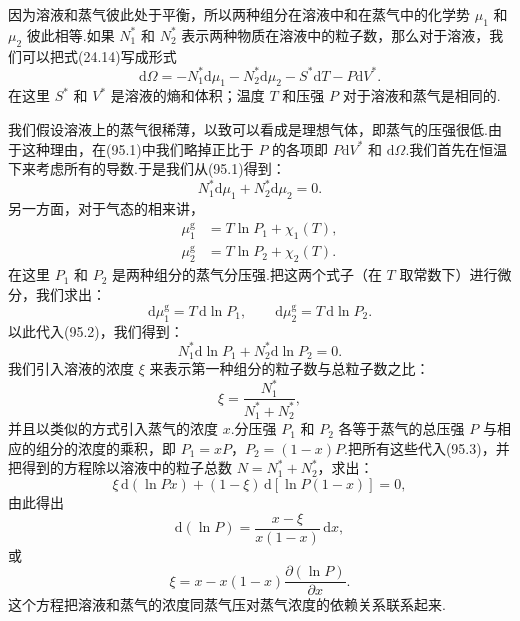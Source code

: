 因为溶液和蒸气彼此处于平衡，所以两种组分在溶液中和在蒸气中的化学势 $\mu_1$ 和 $\mu_2$ 彼此相等.如果 $N_1^{*}$ 和 $N_2^{*}$ 表示两种物质在溶液中的粒子数，那么对于溶液，我们可以把式(24.14)写成形式
\begin{equation}
  \mathrm{d}\varOmega=-N_1^{*}\mathrm{d}\mu_1-N_2^{*}\mathrm{d}\mu_2
  -S^{*}\mathrm{d}T-P\mathrm{d}V^{*}.
\end{equation}
在这里 $S^{*}$ 和 $V^{*}$ 是溶液的熵和体积；温度 $T$ 和压强 $P$ 对于溶液和蒸气是相同的.

我们假设溶液上的蒸气很稀薄，以致可以看成是理想气体，即蒸气的压强很低.由于这种理由，在(95.1)中我们略掉正比于 $P$ 的各项即 $P\mathrm{d}V^{*}$ 和 $\mathrm{d}\varOmega$.我们首先在恒温下来考虑所有的导数.于是我们从(95.1)得到：
\begin{equation}
  N_1^{*}\mathrm{d}\mu_1+N_2^{*}\mathrm{d}\mu_2=0.
\end{equation}
另一方面，对于气态的相来讲，
\begin{equation*}
\begin{aligned}
  \mu_1^{\mathrm{g}}&=T\ln P_1+\chi_1(T),\\
  \mu_2^{\mathrm{g}}&=T\ln P_2+\chi_2(T).
\end{aligned}
\end{equation*}
在这里 $P_1$ 和 $P_2$ 是两种组分的蒸气分压强.把这两个式子（在 $T$ 取常数下）进行微分，我们求出：
\begin{equation*}
  \mathrm{d}\mu_1^{\mathrm{g}}=T\,\mathrm{d}\ln P_1,\qquad
  \mathrm{d}\mu_2^{\mathrm{g}}=T\,\mathrm{d}\ln P_2.
\end{equation*}
以此代入(95.2)，我们得到：
\begin{equation}
  N_1^{*}\mathrm{d}\ln P_1+N_2^{*}\mathrm{d}\ln P_2=0.
\end{equation}
我们引入溶液的浓度 $\xi$ 来表示第一种组分的粒子数与总粒子数之比：
\begin{equation*}
  \xi=\frac{N_1^{*}}{N_1^{*}+N_2^{*}},
\end{equation*}
并且以类似的方式引入蒸气的浓度 $x$.分压强 $P_1$ 和 $P_2$ 各等于蒸气的总压强 $P$ 与相应的组分的浓度的乘积，即 $P_1=xP$，$P_2=(1-x)P$.把所有这些代入(95.3)，并把得到的方程除以溶液中的粒子总数 $N=N_1^{*}+N_2^{*}$，求出：
\begin{equation*}
  \xi\,\mathrm{d}(\ln Px)+(1-\xi)\,\mathrm{d}[\ln P(1-x)]=0,
\end{equation*}
由此得出
\begin{equation*}
  \mathrm{d}(\ln P)=\frac{x-\xi}{x(1-x)}\,\mathrm{d}x,
\end{equation*}
或
\begin{equation}
  \xi=x-x(1-x)\frac{\partial(\ln P)}{\partial x}.
\end{equation}
这个方程把溶液和蒸气的浓度同蒸气压对蒸气浓度的依赖关系联系起来.

